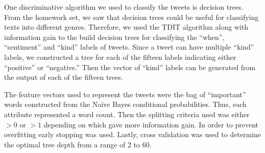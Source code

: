 	One discriminative algorithm we used to classify the tweets is decision trees. From the homework set, we saw that decision trees could be useful for classifying texts into different genres. Therefore, we used the TDIT algorithm along with information gain to the build decision trees for classifying the ``when'', ``sentiment'' and ``kind'' labels of tweets. Since a tweet can have multiple ``kind'' labels, we constructed a tree for each of the fifteen labels indicating either ``positive'' or ``negative.'' Then the vector of ``kind'' labels can be generated from the output of each of the fifteen trees.

	The feature vectors used to represent the tweets were the bag of ``important'' words constructed from the Naïve Bayes conditional probabilities. Thus, each attribute represented a word count. Then the splitting criteria used was either $>0$ or $>1$ depending on which gave more information gain. In order to prevent overfitting early stopping was used. Lastly, cross validation was used to determine the optimal tree depth from a range of 2 to 60. 